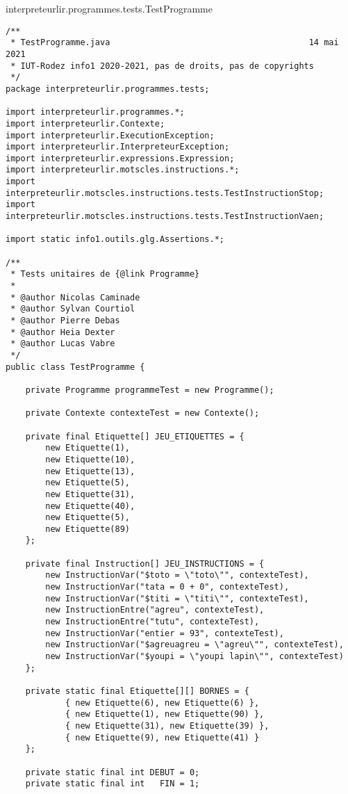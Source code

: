 \begin{enum}
    \item interpreteurlir.programmes.tests.TestProgramme
\begin{verbatim}
/**
 * TestProgramme.java                                        14 mai 2021
 * IUT-Rodez info1 2020-2021, pas de droits, pas de copyrights
 */
package interpreteurlir.programmes.tests;

import interpreteurlir.programmes.*;
import interpreteurlir.Contexte;
import interpreteurlir.ExecutionException;
import interpreteurlir.InterpreteurException;
import interpreteurlir.expressions.Expression;
import interpreteurlir.motscles.instructions.*;
import interpreteurlir.motscles.instructions.tests.TestInstructionStop;
import interpreteurlir.motscles.instructions.tests.TestInstructionVaen;

import static info1.outils.glg.Assertions.*;

/** 
 * Tests unitaires de {@link Programme}
 * 
 * @author Nicolas Caminade
 * @author Sylvan Courtiol
 * @author Pierre Debas
 * @author Heia Dexter
 * @author Lucas Vabre
 */
public class TestProgramme {
    
    private Programme programmeTest = new Programme();

    private Contexte contexteTest = new Contexte();
    
    private final Etiquette[] JEU_ETIQUETTES = {
        new Etiquette(1),
        new Etiquette(10),
        new Etiquette(13),
        new Etiquette(5),
        new Etiquette(31),
        new Etiquette(40),
        new Etiquette(5),
        new Etiquette(89)
    };
    
    private final Instruction[] JEU_INSTRUCTIONS = {
        new InstructionVar("$toto = \"toto\"", contexteTest),
        new InstructionVar("tata = 0 + 0", contexteTest),
        new InstructionVar("$titi = \"titi\"", contexteTest),
        new InstructionEntre("agreu", contexteTest),
        new InstructionEntre("tutu", contexteTest),
        new InstructionVar("entier = 93", contexteTest),
        new InstructionVar("$agreuagreu = \"agreu\"", contexteTest),
        new InstructionVar("$youpi = \"youpi lapin\"", contexteTest)
    };
    
    private static final Etiquette[][] BORNES = {
            { new Etiquette(6), new Etiquette(6) },
            { new Etiquette(1), new Etiquette(90) },
            { new Etiquette(31), new Etiquette(39) },
            { new Etiquette(9), new Etiquette(41) }
    };
    
    private static final int DEBUT = 0;
    private static final int   FIN = 1;
    

\end{verbatim}
\end{enum}
